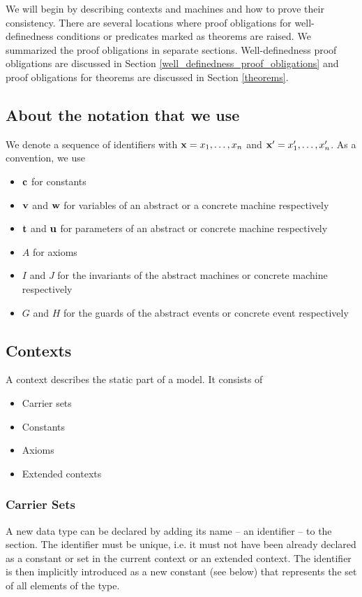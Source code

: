 We will begin by describing contexts and machines and how to prove their consistency.
There are several locations where proof obligations for well-definedness conditions
 or predicates marked as theorems are raised.
We summarized the proof obligations in separate sections. Well-definedness proof obligations are discussed in Section \ref{well_definedness_proof_obligations}
and proof obligations for theorems are discussed in Section \ref{theorems}.


\subsection{About the notation that we use}
\label{about_the_notation}

We denote a sequence of identifiers with $\mathbf{x} = x_1,\ldots,x_n$ and $\mathbf{x}' = x'_1,\ldots,x'_n$.
As a convention, we use
\begin{itemize}
\item $\mathbf{c}$ for constants
\item $\mathbf{v}$ and $\mathbf{w}$ for variables of an abstract or a concrete machine respectively
\item $\mathbf{t}$ and $\mathbf{u}$ for parameters of an abstract or concrete machine respectively
\item $A$ for axioms
\item $I$ and $J$ for the invariants of the abstract machines or concrete machine respectively
\item $G$ and $H$ for the guards of the abstract events or concrete event respectively
\end{itemize}

\subsection{Contexts}
\label{context}

A context describes the static part of a model. It consists of
\begin{itemize}
\item Carrier sets
\item Constants
\item Axioms
\item Extended contexts
\end{itemize}

\subsubsection{Carrier Sets}
\label{carrier_sets}
A new data type can be declared by adding its name -- an identifier -- to the  section.
The identifier must be unique, i.e. it must not have been already declared as a constant or set in the current context or an extended context.
The identifier is then implicitly introduced as a new constant (see below) that represents the set of all elements of the type. 

